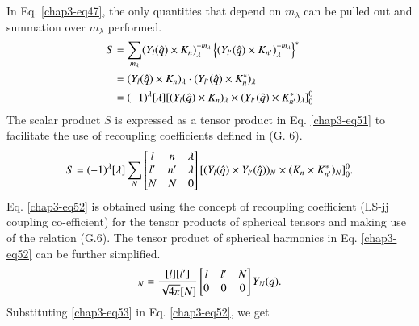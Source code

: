 In Eq. \eqref{chap3-eq47}, the only quantities that depend on $m_\lambda$ can be pulled out and summation over $m_\lambda$ performed.
\begin{align}
  S & = \sum_{m_\lambda} (Y_l ({\boldmath \hat{q}}) \times {\boldmath K}_n)_\lambda^{-m_\lambda}
  \left\{ (Y_{l'} ({\boldmath \hat{q}}) \times {\boldmath K}_{n'})_\lambda^{-m_\lambda}\right\}^\ast \notag \\
  & = (Y_l ({\boldmath \hat{q}}) \times {\boldmath K}_n)_\lambda \cdot (Y_{l'}({\boldmath \hat{q}}) \times {\boldmath K}_n^\ast)_\lambda \notag\\
  & = (-1)^\lambda [\lambda] [(Y_l ({\boldmath \hat{q}}) \times  {\boldmath K}_n)_\lambda \times (Y_{l'}({\boldmath \hat{q}}) \times {\boldmath K}_{n'}^{\ast})_\lambda ]_0^0 \label{chap3-eq51}
\end{align}
The scalar product $S$ is expressed as a tensor product in Eq. \eqref{chap3-eq51} to facilitate the use of recoupling coefficients defined in (G. 6).
\begin{equation}
  S= (-1)^\lambda [\lambda] \sum_{N} \begin{bmatrix} l & n & \lambda \\ l' & n' & \lambda\\ N & N & 0\end{bmatrix}
    [(Y_l ({\boldmath \hat{q}}) \times Y_{l'}({\boldmath \hat{q}}))_N \times ({\boldmath K}_n \times {\boldmath K}_{n'}^\ast)_N]_0^0. \label{chap3-eq52}
\end{equation}
Eq. \eqref{chap3-eq52} is obtained using the concept of recoupling coefficient (LS-jj coupling co-efficient) for the tensor products of spherical tensors and making use of the relation (G.6). The tensor product of spherical harmonics in Eq. \eqref{chap3-eq52} can be further simplified.
\begin{equation}
  [Y_l({\boldmath \hat{q}}) \times Y_{l'}({\boldmath \hat{q}})]_N = \frac{[l][l']}{\sqrt{4\pi}[N]}
  \begin{bmatrix}l & l' & N\\ 0 & 0 & 0  \end{bmatrix} Y_N ({\boldmath q}). \label{chap3-eq53}
\end{equation}
Substituting \eqref{chap3-eq53} in Eq. \eqref{chap3-eq52}, we get
